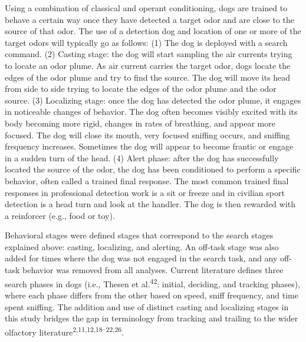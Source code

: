 \documentclass[
]{article}
\begin{document}
Using a combination of classical and operant conditioning, dogs are trained to behave a certain way once they have detected a target odor and are close to the source of that odor. The use of a detection dog and location of one or more of the target odors will typically go as follows: (1) The dog is deployed with a search command. (2) Casting stage: the dog will start sampling the air currents trying to locate an odor plume. As air current carries the target odor, dogs locate the edges of the odor plume and try to find the source. The dog will move its head from side to side trying to locate the edges of the odor plume and the odor source. (3) Localizing stage: once the dog has detected the odor plume, it engages in noticeable changes of behavior. The dog often becomes visibly excited with its body becoming more rigid, changes in rates of breathing, and appear more focused. The dog will close its mouth, very focused sniffing occurs, and sniffing frequency increases. Sometimes the dog will appear to become frantic or engage in a sudden turn of the head. (4) Alert phase: after the dog has successfully located the source of the odor, the dog has been conditioned to perform a specific behavior, often called a trained final response. The most common trained final responses in professional detection work is a sit or freeze and in civilian sport detection is a head turn and look at the handler. The dog is then rewarded with a reinforcer (e.g., food or toy).

Behavioral stages were defined stages that correspond to the search stages explained above: casting, localizing, and alerting. An off-task stage was also added for times where the dog was not engaged in the search task, and any off-task behavior was removed from all analyses. Current literature defines three search phases in dogs (i.e., Thesen et al.\textsuperscript{42}: initial, deciding, and tracking phases), where each phase differs from the other based on speed, sniff frequency, and time spent sniffing. The addition and use of distinct casting and localizing stages in this study bridges the gap in terminology from tracking and trailing to the wider olfactory literature\textsuperscript{2,11,12,18--22,26}.
\end{document}
